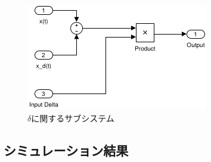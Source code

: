 \documentclass[a4paper,12pt]{jarticle}
\begin{document}
\begin{figure}[H]
 \begin{center}
  \includegraphics[scale=0.8]{../figure/fig/delta.png}
  \caption{$\delta$に関するサブシステム}
  \label{delta}
 \end{center}
\end{figure}
\subsection{シミュレーション結果}
\end{document}
